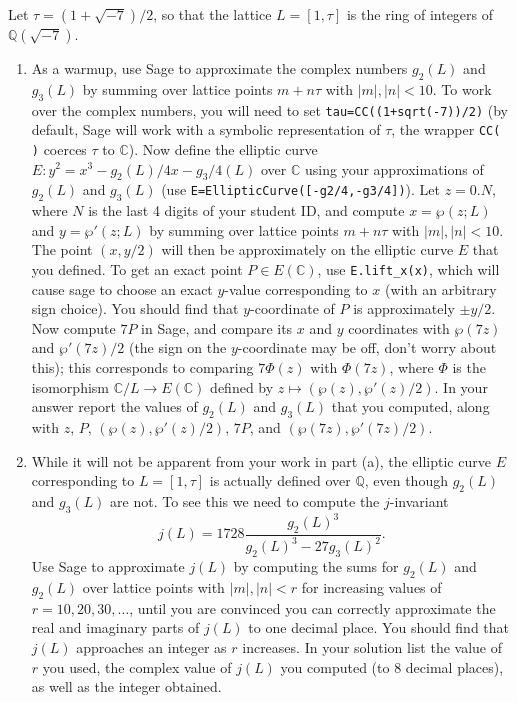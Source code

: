 \documentclass[11pt]{article}
\newcommand{\Q}{\mathbb{Q}}
\newcommand{\C}{\mathbb{C}}
\begin{document}
Let $\tau=(1+\sqrt{-7})/2$, so that the lattice $L=[1,\tau]$ is the ring of integers of $\Q(\sqrt{-7})$.

\begin{enumerate}[{\bf (a)}]
\item 
As a warmup, use Sage to approximate the complex numbers $g_2(L)$ and $g_3(L)$ by summing over lattice points $m+n\tau$ with $|m|,|n|< 10$.
To work over the complex numbers, you will need to set \texttt{tau=CC((1+sqrt(-7))/2)} (by default, Sage will work with a symbolic representation of $\tau$, the wrapper \texttt{CC( )} coerces $\tau$ to $\C$).
Now define the elliptic curve $E:y^2=x^3-g_2(L)/4 x - g_3/4(L)$ over $\C$ using your approximations of $g_2(L)$ and $g_3(L)$ (use \texttt{E=EllipticCurve([-g2/4,-g3/4])}).
Let $z=0.N$, where $N$ is the last 4 digits of your student ID, and compute $x=\wp(z;L)$ and $y=\wp'(z;L)$ by summing over lattice points $m+n\tau$ with $|m|,|n|<10$.
The point $(x,y/2)$ will then be approximately on the elliptic curve $E$ that you defined.
To get an exact point $P\in E(\C)$, use \texttt{E.lift\_x(x)}, which will cause sage to choose an exact $y$-value corresponding to $x$ (with an arbitrary sign choice).
You should find that $y$-coordinate of $P$ is approximately $\pm y/2$.
Now compute $7P$ in Sage, and compare its $x$ and $y$ coordinates with $\wp(7z)$ and $\wp'(7z)/2$ (the sign on the $y$-coordinate may be off, don't worry about this); this corresponds to comparing $7\Phi(z)$ with $\Phi(7z)$, where $\Phi$ is the isomorphism $\C/L\to E(\C)$ defined by $z\mapsto (\wp(z),\wp'(z)/2)$.
In your answer report the values of $g_2(L)$ and $g_3(L)$ that you computed, along with $z$, $P$, $(\wp(z),\wp'(z)/2)$, $7P$, and $(\wp(7z),\wp'(7z)/2)$.

\item
While it will not be apparent from your work in part (a), the elliptic curve $E$ corresponding to $L=[1,\tau]$ is actually defined over $\Q$, even though $g_2(L)$ and $g_3(L)$ are not.
To see this we need to compute the $j$-invariant
\[
j(L) = 1728\frac{g_2(L)^3}{g_2(L)^3-27g_3(L)^2}.
\]
Use Sage to approximate $j(L)$ by computing the sums for $g_2(L)$ and $g_2(L)$ over lattice points with $|m|,|n|< r$ for increasing values of $r=10,20,30,\ldots$, until you are convinced you can correctly approximate the real and imaginary parts of $j(L)$ to one decimal place. You should find that $j(L)$ approaches an integer as $r$ increases.
In your solution list the value of $r$ you used, the complex value of $j(L)$ you computed (to 8 decimal places), as well as the integer obtained.


\end{enumerate}
\end{document}
